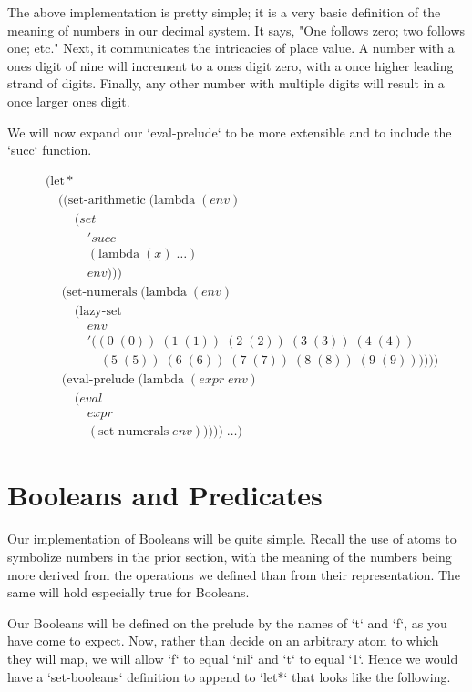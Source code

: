 The above implementation is pretty simple; it is a very basic definition of the meaning of numbers in our decimal system. It says, "One follows zero; two follows one; etc." Next, it communicates the intricacies of place value. A number with a ones digit of nine will increment to a ones digit zero, with a once higher leading strand of digits. Finally, any other number with multiple digits will result in a once larger ones digit.

We will now expand our `eval-prelude` to be more extensible and to include the `succ` function.

\begin{align*}
& (\text{let}* \; 
\\& \quad ((\text{set-arithmetic} \; (\text{lambda} \; (env)
\\& \qquad \; (set
\\& \qquad \quad \; 'succ
\\& \qquad \quad \; (\text{lambda} \; (x) \; \dots)
\\& \qquad \quad \; env)))
\\& \quad \; (\text{set-numerals} \; (\text{lambda} \; (env) \; 
\\& \qquad \; (\text{lazy-set} \; 
\\& \qquad \quad \; env \; 
\\& \qquad \quad \; '((0 \; (0)) \; (1 \; (1)) \; (2 \; (2)) \; (3 \; (3)) \; (4 \; (4)) \; 
\\& \qquad \qquad \; (5 \; (5)) \; (6 \; (6)) \; (7 \; (7)) \; (8 \; (8)) \; (9 \; (9))))))
\\& \quad \; (\text{eval-prelude} \; (\text{lambda} \; (expr \; env)
\\& \qquad \; (eval \; 
\\& \qquad \quad \; expr
\\& \qquad \quad \; (\text{set-numerals} \; env))))) \; \dots)
\end{align*}

\section{Booleans and Predicates}
Our implementation of Booleans will be quite simple. Recall the use of atoms to symbolize numbers in the prior section, with the meaning of the numbers being more derived from the operations we defined than from their representation. The same will hold especially true for Booleans.

Our Booleans will be defined on the prelude by the names of `t` and `f`, as you have come to expect. Now, rather than decide on an arbitrary atom to which they will map, we will allow `f` to equal `nil` and `t` to equal `1`. Hence we would have a `set-booleans` definition to append to `let*` that looks like the following.

